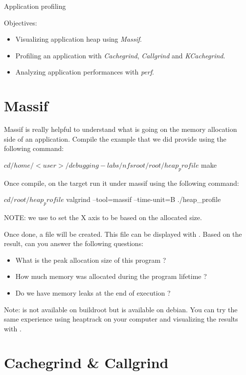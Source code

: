\subchapter
{Application profiling}
{Objectives:
  \begin{itemize}
    \item Visualizing application heap using {\em Massif}.
    \item Profiling an application with {\em Cachegrind}, {\em Callgrind} and
          {\em KCachegrind}.
    \item Analyzing application performances with {\em perf}.
  \end{itemize}
}

\section{Massif}

Massif is really helpful to understand what is going on the memory allocation
side of an application. Compile the  example that we did provide
using the following command:

\begin{bashinput}
$ cd /home/<user>/debugging-labs/nfsroot/root/heap_profile
$ make
\end{bashinput}

Once compile, on the target run it under massif using the following command:

\begin{bashinput}
$ cd /root/heap_profile
$ valgrind --tool=massif --time-unit=B ./heap_profile
\end{bashinput}

NOTE: we use  to set the X axis to be based on the allocated
size.

Once done, a  file will be created. This file can be
displayed with . Based on the result, can you answer the
following questions:
\begin{itemize}
  \item What is the peak allocation size of this program ?
  \item How much memory was allocated during the program lifetime ?
  \item Do we have memory leaks at the end of execution ?
\end{itemize}

Note:  is not available on buildroot but is available on debian.
You can try the same experience using heaptrack on your computer and visualizing
the results with .

\section{Cachegrind \& Callgrind}

